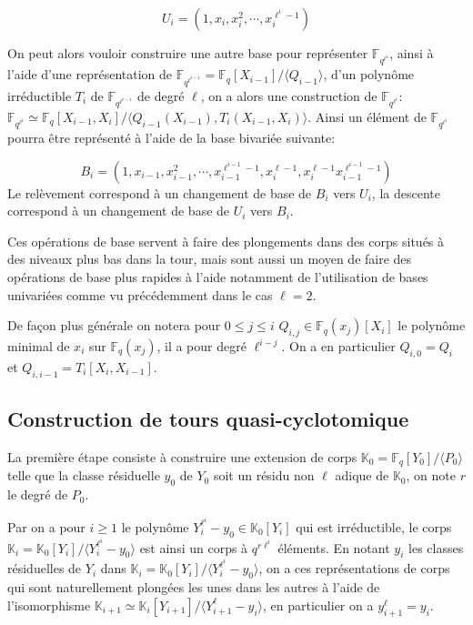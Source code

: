 \documentclass[10pt,a4paper]{book}
\theoremstyle{plain}
\theoremstyle{definition}
\theoremstyle{definition}
\theoremstyle{definition}
\theoremstyle{definition}
\theoremstyle{remark}
\theoremstyle{remark}
\theoremstyle{definition}
\begin{document}
\[
U_i=(1,x_i,x_i^2,\cdots,x_i^{\ell^i-1})
\]

On peut alors vouloir construire une autre base pour représenter $\mathbb{F}_{q^{\ell^i}}$, ainsi à l'aide d'une représentation de $\mathbb{F}_{q^{\ell^{i-1}}}=\mathbb{F}_q[X_{i-1}]/\langle Q_{i-1} \rangle $, d'un polynôme irréductible $T_{i}$ de $\mathbb{F}_{q^{\ell^{i-1}}}$ de degré $\ell$, on a alors une construction de $\mathbb{F}_{q^{\ell^i}}$: $\mathbb{F}_{q^{\ell^{i}}}\simeq \mathbb{F}_q[X_{i-1},X_{i}]/\langle Q_{i-1}(X_{i-1}), T_i(X_{i-1},X_{i}) \rangle $. Ainsi un élément de $\mathbb{F}_{q^{\ell^{i}}}$ pourra être représenté à l'aide de la base bivariée suivante:

\[
B_i=(1,x_{i-1},x_{i-1}^2,\cdots,x_{i-1}^{\ell^{i-1}-1},x_i^{\ell-1},x_i^{\ell-1}x_{i-1}^{\ell^{i-1}-1})
\] 
Le relèvement correspond à un changement de base de $B_i$ vers $U_i$, la descente correspond à un changement de base de $U_i$ vers $B_i$.

Ces opérations de base servent à faire des plongements dans des corps situés à des niveaux plus bas dans la tour, mais sont aussi un moyen de faire des opérations de base plus rapides à l'aide notamment de l'utilisation de bases univariées comme vu précédemment dans le cas $\ell=2$.

De façon plus générale on notera pour $0 \leqslant j \leqslant i $ $Q_{i,j} \in \mathbb{F}_q(x_j)[X_i]$ le polynôme minimal de $x_i$ sur $\mathbb{F}_{q}(x_j)$, il a pour degré $\ell^{i-j}$. On a en particulier $Q_{i,0}=Q_i$ et $Q_{i,i-1}=T_{i}[X_i,X_{i-1}]$.

\subsection{Construction de tours quasi-cyclotomique}
La première étape consiste à construire une extension de corps $\mathbb{K}_0=\mathbb{F}_q[Y_0]/\langle P_0 \rangle$ telle que la classe résiduelle $y_0$ de $Y_0$ soit un résidu non $\ell$ adique de $\mathbb{K}_0$, on note $r$ le degré de $P_0$.

Par \cite[Th. VI.9.1]{Lang2002algebra} on a pour $i \geqslant 1$ le polynôme $Y_i^{\ell^i}-y_0 \in \mathbb{K}_0[Y_i]$ qui est irréductible, le corps $\mathbb{K}_i=\mathbb{K}_0[Y_i]/\langle Y_i^{\ell^i}-y_0 \rangle$ est ainsi un corps à $q^{r\ell^i}$ éléments. En notant $y_i$ les classes résiduelles de $Y_i$ dans $\mathbb{K}_i=\mathbb{K}_0[Y_i]/\langle Y_i^{\ell^i}-y_0 \rangle$, on a ces représentations de corps qui sont naturellement plongées les unes dans les autres à l'aide de l'isomorphisme $\mathbb{K}_{i+1} \simeq \mathbb{K}_i[Y_{i+1}]/\langle Y_{i+1}^{\ell}-y_i\rangle $, en particulier on a $y_{i+1}^{\ell}=y_i$.
\end{document}
